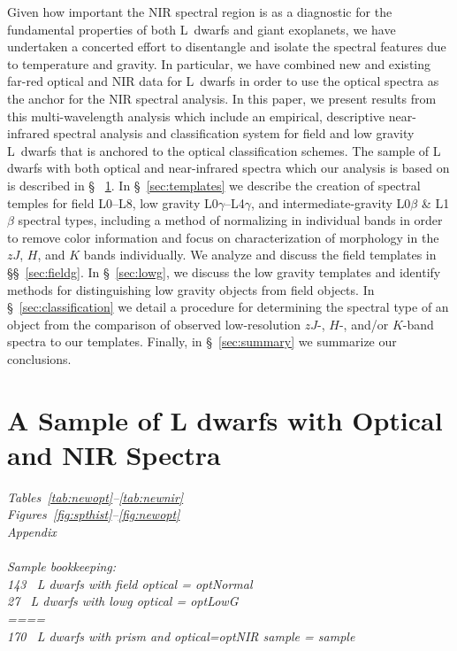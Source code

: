 \documentclass[12pt,preprint]{aastex}
\newcommand{\sample}{170}
\newcommand{\optField}{143}
\newcommand{\optLowG}{27}
\begin{document}
Given how important the NIR spectral region is as a diagnostic for the fundamental properties of both L~dwarfs and giant exoplanets, we have undertaken a concerted effort to disentangle and isolate the spectral features due to temperature and gravity. 
In particular, we have combined new and existing far-red optical and NIR data for L~dwarfs in order to use the optical spectra as the anchor for the NIR spectral analysis. 
In this paper, we present results from this multi-wavelength analysis which include an empirical, descriptive near-infrared spectral analysis and classification system for field and low gravity L~dwarfs that is anchored to the optical classification schemes. 
The sample of L dwarfs with both optical and near-infrared spectra which our analysis is based on is described in \S~ \ref{sec:sample}. 
In \S~\ref{sec:templates} we describe the creation of spectral temples for field L0--L8, low gravity L0$\gamma$--L4$\gamma$, and intermediate-gravity L0$\beta$ \& L1$\beta$ spectral types, including a method of normalizing in individual bands in order to remove color information and focus on characterization of morphology in the $zJ$, $H$, and $K$ bands individually. 
We analyze and discuss the field templates in \S\S~\ref{sec:fieldg}. 
In \S~\ref{sec:lowg}, we discuss the low gravity templates and identify methods for distinguishing low gravity objects from field objects. 
In \S~\ref{sec:classification} we detail a procedure for determining the spectral type of an object from the comparison of observed low-resolution $zJ$-, $H$-, and/or $K$-band spectra to our templates.
Finally, in \S~\ref{sec:summary} we summarize our conclusions.



\clearpage
\section{A Sample of L dwarfs with Optical and NIR Spectra}
\label{sec:sample}

\emph{
Tables~\ref{tab:newopt}--\ref{tab:newnir}\\
Figures~\ref{fig:spthist}--\ref{fig:newopt}\\
Appendix\\
\\
Sample bookkeeping:\\
\optField~ L dwarfs with field optical =  \emph{optNormal}\\
\optLowG~ L dwarfs with lowg optical = \emph{optLowG} \\
====\\
\sample~ L dwarfs with prism and optical=optNIR sample = \emph{sample}\\
}
\end{document}
